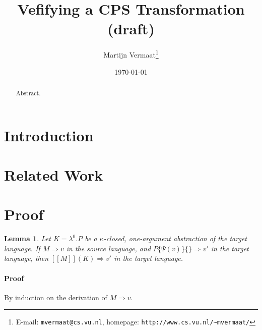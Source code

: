 \documentclass[a4paper,11pt]{article}
\title{Vefifying a CPS Transformation (draft)}
\author{Martijn Vermaat\footnote{E-mail: \texttt{mvermaat@cs.vu.nl},
    homepage: \texttt{http://www.cs.vu.nl/\~{}mvermaat/}}}
\date{\today}
\newtheorem{lemma}{Lemma}
\begin{document}
\maketitle


\begin{abstract}
  Abstract.
\end{abstract}


\section{Introduction}\label{sec:introduction}


\section{Related Work}\label{sec:related}


\section{Proof}\label{sec:proof}

\begin{lemma}
  Let $K = \lambda^{0}.P$ be a $\kappa$-closed, one-argument
  abstraction of the target language. If $M \Rightarrow v$ in the
  source language, and $P\{\Psi(v)\}\{\} \Rightarrow v'$ in the target
  language, then $[\![M]\!](K) \Rightarrow v'$ in the target language.
\end{lemma}

\paragraph{Proof}

By induction on the derivation of $M \Rightarrow v$.

\end{document}
